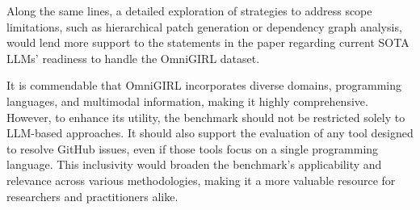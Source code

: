 \documentclass[12pt,american]{article}
\begin{document}
\begin{revweakness}
Along the same lines, a detailed exploration of strategies to address scope limitations, such as hierarchical patch generation or dependency graph analysis, would lend more support to the statements in the paper regarding current SOTA LLMs' readiness to handle the OmniGIRL dataset.    
\end{revweakness}

\begin{revresponse}

\end{revresponse}


\reviewer\label{sec:reviewer3}
\begin{revcomment}
It is commendable that OmniGIRL incorporates diverse domains, programming languages, and multimodal information, making it highly comprehensive. However, to enhance its utility, the benchmark should not be restricted solely to LLM-based approaches. It should also support the evaluation of any tool designed to resolve GitHub issues, even if those tools focus on a single programming language. This inclusivity would broaden the benchmark's applicability and relevance across various methodologies, making it a more valuable resource for researchers and practitioners alike.
\end{revcomment}

\begin{revresponse}

\end{revresponse}
\end{document}
